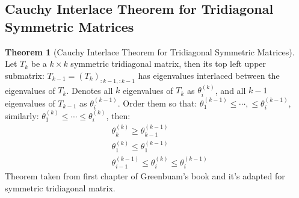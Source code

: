 \documentclass[]{article}
\theoremstyle{definition}
\newtheorem{theorem}{Theorem}            %
\begin{document}
\begin{appendices}
        \subsection{Cauchy Interlace Theorem for Tridiagonal Symmetric Matrices}
            \begin{theorem}[Cauchy Interlace Theorem for Tridiagonal Symmetric Matrices]\label{theorem:cauchy_interlace}
                Let $T_k$ be a $k\times k$ symmetric tridiagonal matrix, then its top left upper submatrix: $T_{k-1}=(T_k)_{:k - 1, :k -1}$ has eigenvalues interlaced between the eigenvalues of $T_k$. Denotes all $k$ eigenvalues of $T_k$ as $\theta_i^{(k)}$, and all $k - 1$ eigenvalues of $T_{k - 1}$ as $\theta_i^{(k - 1)}$. Order them so that: $\theta_1^{(k - 1)} \le \cdots, \le \theta_i^{(k - 1)}$, similarly: $\theta_1^{(k)}\le \cdots \le \theta_i^{(k)}$, then: 
                \begin{align}
                    & \theta_{k}^{(k)} \ge \theta_{k - 1}^{(k - 1)}
                    \\
                    & \theta_{1}^{(k)} \le \theta_{1}^{(k - 1)}
                    \\
                    & \theta_{i -1}^{(k - 1)} \le \theta_{i}^{(k)} \le \theta_{i}^{(k - 1)}
                \end{align}
                Theorem taken from first chapter of Greenbuam's book\cite{book:greenbaum} and it's adapted for symmetric tridiagonal matrix. 
            \end{theorem}

\end{appendices}
\end{document}
